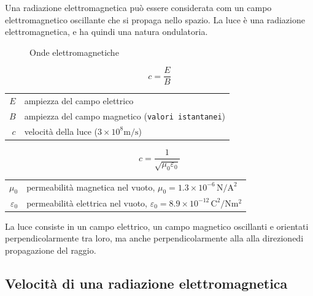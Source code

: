 \begin{defi}
  Una radiazione elettromagnetica può essere considerata com un campo elettromagnetico oscillante che
  si propaga nello spazio. {\color{red}La luce è una radiazione elettromagnetica, e ha quindi una natura
    ondulatoria.}
\begin{figure}[th!]
    \centering
    
    \caption{Onde elettromagnetiche}
    \label{fig:ondelect}
\end{figure}
\begin{center}
  \begin{minipage}{.5\linewidth}
    \[
      c = \frac{E}{B}
    \]
    \begin{tabular}{r@{${}={}$}p{.8\linewidth}}
      $E$ & ampiezza del campo elettrico \\
      $B$ & ampiezza del campo magnetico (\texttt{valori istantanei}) \\
      $c$ & velocità della luce ($3\times10^8\mathrm{m/s}$) \\
    \end{tabular}
  \end{minipage}%
  \begin{minipage}{.5\linewidth}
    \[
      c = \frac{1}{\sqrt{\mu_0 \varepsilon_0}}
    \]
    \begin{tabular}{r@{${}={}$}p{.8\linewidth}}
      $\mu_0$ & permeabilità magnetica nel vuoto, $\mu_0 = 1.3\times10^{-6}\,\mathrm{N/A^2}$ \\
      $\varepsilon_0$ & permeabilità elettrica nel vuoto, $\varepsilon_0 = 8.9\times10^{-12}\,\mathrm{C^2/N m^2}$ \\
    \end{tabular}
  \end{minipage}
\end{center}
\end{defi}
\begin{nota}
  La luce consiste in un campo elettrico, un campo magnetico oscillanti e orientati perpendicolarmente
  tra loro, ma anche perpendicolarmente alla alla direzionedi propagazione del raggio.
\end{nota}

\subsection{Velocità di una radiazione elettromagnetica}
\label{sec:veldiunaradelect}

